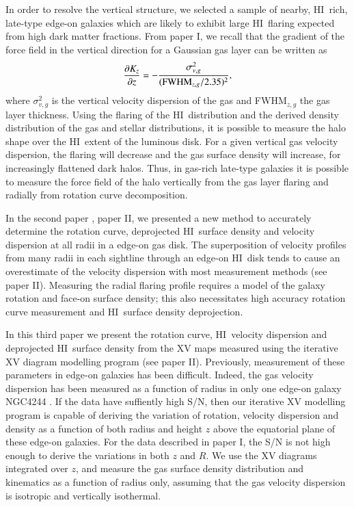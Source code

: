\documentclass[traditabstract]{aa} %
\newcommand\HI{H{\small I}}
\begin{document}
 In order to resolve the vertical structure, we selected a sample of 
 nearby, \HI\ rich, late-type edge-on galaxies which are likely to exhibit 
 large \HI\ flaring expected from high dark matter fractions. From 
 paper I, we recall that the gradient of the force field in the vertical
direction for a Gaussian gas layer can be written as 
\begin{equation}
\label{eq:ch1-hydro}
\frac{\partial K_z}{\partial z} = -
\frac{\sigma_{v,g}^2}{({\rm FWHM}_{z,g}/2.35)^2},
\end{equation}
where $\sigma_{v,g}^2$ is the vertical velocity dispersion of the gas and
FWHM$_{z,g}$ the gas layer thickness. 
Using the flaring of the \HI\ distribution 
and the derived density distribution
of the gas and stellar distributions, it is possible to measure the
halo shape over the \HI\ extent of the luminous disk.  For
a given vertical gas velocity dispersion, the flaring will decrease
and the gas surface density will increase, for increasingly flattened
dark halos. Thus, in gas-rich late-type galaxies it is possible to
measure the force field of the halo vertically from the gas layer 
flaring and radially from rotation curve decomposition.


In the second paper \citep{ofk2008b}, paper II,
we presented a new method to accurately determine the
rotation curve, deprojected \HI\ surface density and velocity
dispersion at all radii in a edge-on gas disk.  The
superposition of velocity profiles from many radii in each sightline
through an edge-on \HI\ disk tends to cause an overestimate of the
velocity dispersion with most measurement methods (see paper II).
Measuring the radial flaring profile requires a model of the galaxy
rotation and face-on surface density; this also necessitates high
accuracy rotation curve measurement and \HI\ surface density
deprojection.

In this third paper we present the rotation curve, 
\HI\ velocity dispersion
and deprojected \HI\ surface density from the XV maps measured using the
iterative XV diagram modelling program (see paper II). 
Previously, measurement of these parameters in edge-on galaxies has been 
difficult. Indeed, the gas velocity dispersion has been measured
as a function of radius in only one edge-on galaxy NGC4244
\citep{olling1996a}. If the data have suffiently high S/N, then
our iterative XV modelling program is capable of deriving the
variation of rotation, velocity dispersion and density as a function
of both radius and height $z$ above the equatorial plane of these
edge-on galaxies. For the data described in paper I, the S/N is not
high enough to derive the variations in both $z$ and $R$. We use
the XV diagrams integrated over $z$, and measure the gas surface
density distribution and kinematics as a function of radius only,
assuming that the gas velocity dispersion is isotropic and vertically
isothermal.
\end{document}
